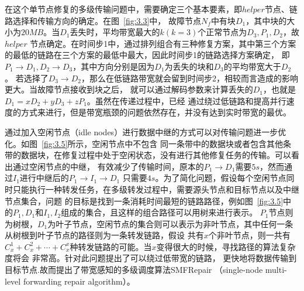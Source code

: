 在这个单节点修复的多级传输问题中，需要确定三个基本要素，即$helper$节点、链路选择和传输方向的确定。在图~\ref{fig:3.3}中，
故障节点$N_f$中有块$D_1$，其中块的大小为$20MB$。当$D_1$丢失时，平均带宽最大的$k(k=3)$个正常节点为$D_3,P_1,D_2$，故$helper$
节点确定。在时间步1中，通过排列组合有三种修复方案，其中第三个方案的最低的链路在三个方案的最低中最大，因此时间步1的链路选择方案确定，
即$P_1\rightarrow D_1,D_2\rightarrow D_3$，其中方向分别是因为$D_1$为丢失的块和$D_3$的平均带宽大于$D_2$。
若选择了$D_3\rightarrow D_2$，那么在低链路带宽就会留到时间步2，相较而言造成的影响更大。当故障节点接收到块之后，
就可以通过解码参数来计算丢失的$D_1$，也就是$D_1=xD_2+yD_3+zP_1$。虽然在传递过程中，已经
通过绕过低链路和提高并行速度的方式来进行，但是带宽瓶颈的问题依然存在，并没有达到实时带宽的最优。

通过加入空闲节点（idle nodes）进行数据中继的方式可以对传输问题进一步优化。如图~\ref{fig:3.5}所示，空闲节点中不包含
同一条带中的数据块或者包含其他条带的数据块，在修复过程中处于空闲状态，没有进行其他修复任务的传输。可以看出通过空闲节点的中继，
有效减少了传输时间，原本的$P_1\rightarrow D_1$需要$5s$，然而通过$I_1$进行中继后的$P_1\rightarrow I_1 \rightarrow D_1$
只需要$4s$。为了简化问题，假设每个空闲节点同时只能执行一种转发任务，在多级转发过程中，需要源头节点和目标节点以及中继节点集合，问题
的目标是找到一条消耗时间最短的链路路径，例如图~\ref{fig:3.5}中的$P_1,D_1$和$I_1,I_2$组成的集合，且这样的组合路径可以用树来进行表示。
$P_1$节点则为树根，$D_1$为叶子节点，空闲节点的集合则可以表示为非叶节点，其中任何一条从树根到叶子节点的路径则为一条转发链路，假设
共有$x$个非叶节点，则一共有$C_{x}^{1}+C_{x}^{2}+\cdots+C_{x}^{x}$种转发链路的可能。当$x$变得很大的时候，寻找路径的算法复杂度将会
非常高。针对此问题\citet{zhou2022bandwidth}提出了可以绕过低带宽的链路，
更快地将数据传输到目标节点.故而提出了带宽感知的多级调度算法SMFRepair
（single-node multi-level forwarding repair algorithm）。

